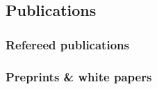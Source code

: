 \documentclass[12pt,letterpaper]{article}
\begin{document}
\ifdefined\withpubs
  \subsection{Publications}
  

  \subsubsection{Refereed publications}
  \begin{list}{}{\cvlist}
    
  \end{list}

  \subsubsection{Preprints \& white papers}
  \begin{list}{}{\cvlist}
    
  \end{list}
\fi
\end{document}
